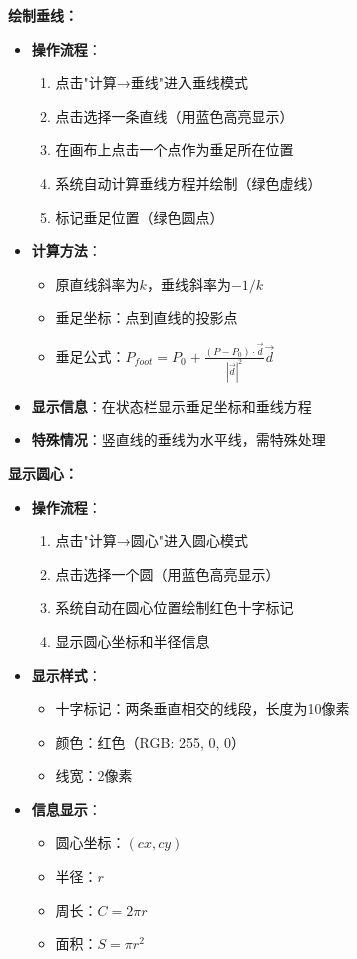 \documentclass[12pt,a4paper]{article}
\begin{document}
\begin{tcolorbox}
\textbf{绘制垂线：}
\begin{itemize}
    \item \textbf{操作流程}：
    \begin{enumerate}
        \item 点击"计算→垂线"进入垂线模式
        \item 点击选择一条直线（用蓝色高亮显示）
        \item 在画布上点击一个点作为垂足所在位置
        \item 系统自动计算垂线方程并绘制（绿色虚线）
        \item 标记垂足位置（绿色圆点）
    \end{enumerate}
    \item \textbf{计算方法}：
    \begin{itemize}
        \item 原直线斜率为$k$，垂线斜率为$-1/k$
        \item 垂足坐标：点到直线的投影点
        \item 垂足公式：$P_{foot} = P_0 + \frac{(P-P_0) \cdot \vec{d}}{|\vec{d}|^2} \vec{d}$
    \end{itemize}
    \item \textbf{显示信息}：在状态栏显示垂足坐标和垂线方程
    \item \textbf{特殊情况}：竖直线的垂线为水平线，需特殊处理
\end{itemize}

\textbf{显示圆心：}
\begin{itemize}
    \item \textbf{操作流程}：
    \begin{enumerate}
        \item 点击"计算→圆心"进入圆心模式
        \item 点击选择一个圆（用蓝色高亮显示）
        \item 系统自动在圆心位置绘制红色十字标记
        \item 显示圆心坐标和半径信息
    \end{enumerate}
    \item \textbf{显示样式}：
    \begin{itemize}
        \item 十字标记：两条垂直相交的线段，长度为10像素
        \item 颜色：红色（RGB: 255, 0, 0）
        \item 线宽：2像素
    \end{itemize}
    \item \textbf{信息显示}：
    \begin{itemize}
        \item 圆心坐标：$(cx, cy)$
        \item 半径：$r$
        \item 周长：$C = 2\pi r$
        \item 面积：$S = \pi r^2$
    \end{itemize}
\end{itemize}


\end{tcolorbox}
\end{document}
